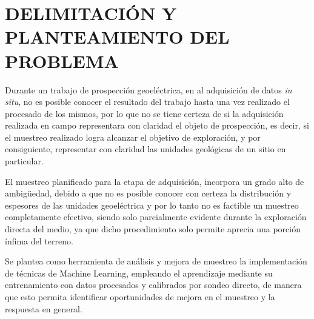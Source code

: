 \chapter{DELIMITACIÓN Y PLANTEAMIENTO DEL PROBLEMA}

Durante un trabajo de prospección geoeléctrica, en al adquisición de datos \textit{in situ}, no es posible conocer el resultado del trabajo hasta una vez realizado el procesado de los mismos, por lo que no se tiene certeza de si la adquisición realizada en campo representara con claridad el objeto de prospección, es decir, si el muestreo realizado logra alcanzar el objetivo de exploración, y por consiguiente, representar con claridad las unidades geológicas de un sitio en particular.

El muestreo planificado para la etapa de adquisición, incorpora un grado alto de ambigüedad, debido a que no es posible conocer con certeza la distribución y espesores de las unidades geoeléctrica y por lo tanto no es factible un muestreo completamente efectivo, siendo solo parcialmente evidente durante la exploración directa del medio, ya que dicho procedimiento solo permite aprecia una porción ínfima del terreno.

Se plantea como herramienta de análisis y mejora de muestreo la implementación de técnicas de Machine Learning, empleando el aprendizaje mediante su entrenamiento con datos procesados y calibrados por sondeo directo, de manera que esto permita identificar oportunidades de mejora en el muestreo y la respuesta en general.


  
     